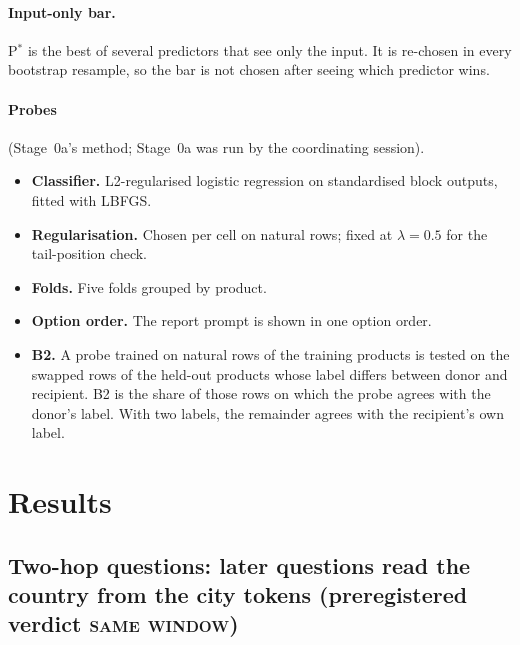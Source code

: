 \documentclass[11pt]{article}
\newcommand{\verdict}[1]{\textsc{\MakeLowercase{#1}}}
\begin{document}
\paragraph{Input-only bar.} P$^*$ is the best of several predictors that see only the input. It is re-chosen in every bootstrap resample, so the bar is not chosen after seeing which predictor wins.

\paragraph{Probes} (Stage~0a's method; Stage~0a was run by the coordinating session).
\begin{itemize}
\item \textbf{Classifier.} L2-regularised logistic regression on standardised block outputs, fitted with LBFGS.
\item \textbf{Regularisation.} Chosen per cell on natural rows; fixed at $\lambda = 0.5$ for the tail-position check.
\item \textbf{Folds.} Five folds grouped by product.
\item \textbf{Option order.} The report prompt is shown in one option order.
\item \textbf{B2.} A probe trained on natural rows of the training products is tested on the swapped rows of the held-out products whose label differs between donor and recipient. B2 is the share of those rows on which the probe agrees with the donor's label. With two labels, the remainder agrees with the recipient's own label.
\end{itemize}

\section{Results}

\subsection{Two-hop questions: later questions read the country from the city tokens (preregistered verdict \verdict{SAME WINDOW})}
\end{document}
